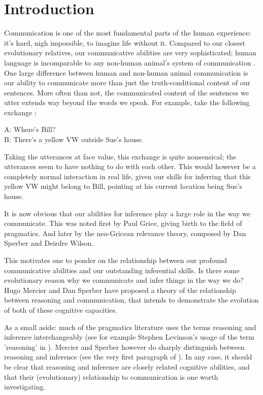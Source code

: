 \chapter*{Introduction}
\label{ch:introduction}


Communication is one of the most fundamental parts of the human experience: it's hard, nigh impossible, to imagine life without it. Compared to our closest evolutionary relatives, our communicative abilities are very sophisticated; human language is incomparable to any non-human animal's system of communication \citep{CheneySeyfarth98}.
One large difference between human and non-human animal communication is our ability to communicate more than just the truth-conditional content of our sentences. More often than not, the communicated content of the sentences we utter extends way beyond the words we speak. For example, take the following exchange \citep[p.~102]{Levinson83}:
\begin{quoting}
    A: Where's Bill? \\
    B: There's a yellow VW outside Sue's house.
\end{quoting}
Taking the utterances at face value, this exchange is quite nonsensical; the utterances seem to have nothing to do with each other. This would however be a completely normal interaction in real life, given our skills for inferring that this yellow VW might belong to Bill, pointing at his current location being Sue's house.

It is now obvious that our abilities for inference play a large role in the way we communicate. This was noted first by Paul Grice, giving birth to the field of pragmatics. And later by the neo-Gricean relevance theory, composed by Dan Sperber and Deirdre Wilson.

This motivates one to ponder on the relationship between our profound communicative abilities and our outstanding inferential skills. Is there some evolutionary reason why we communicate and infer things in the way we do?
Hugo Mercier and Dan Sperber have proposed a theory of the relationship between reasoning and communication, that intends to demonstrate the evolution of both of these cognitive capacities.

As a small aside: much of the pragmatics literature uses the terms reasoning and inference interchangeably (see for example Stephen Levinson's usage of the term 'reasoning' in \citet[p.~218]{Levinson83}). Mercier and Sperber however do sharply distinguish between reasoning and inference (see the very first paragraph of \citet{MS11}).
In any case, it should be clear that reasoning and inference are closely related cognitive abilities, and that their (evolutionary) relationship to communication is one worth investigating.


